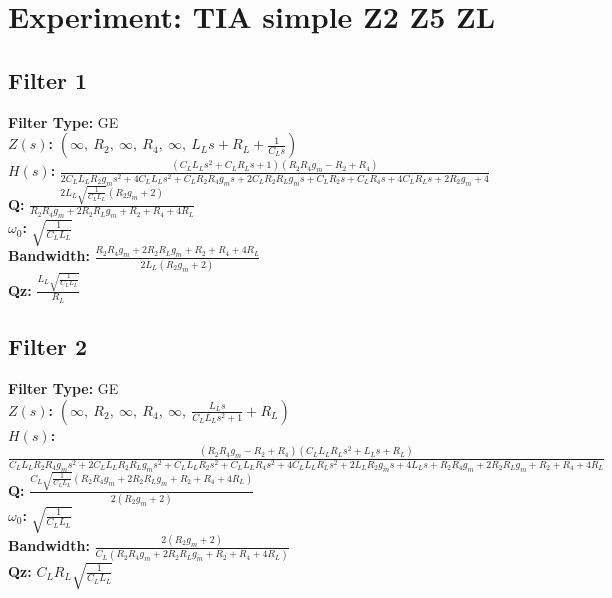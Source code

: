 \documentclass{article}
\begin{document}
        \section*{Experiment: TIA simple Z2 Z5 ZL}
\subsection*{Filter 1}
\textbf{Filter Type:} GE \\ 
\textbf{$Z(s)$:} $\left( \infty, \  R_{2}, \  \infty, \  R_{4}, \  \infty, \  L_{L} s + R_{L} + \frac{1}{C_{L} s}\right)$ \\ 
\textbf{$H(s)$:} $\frac{\left(C_{L} L_{L} s^{2} + C_{L} R_{L} s + 1\right) \left(R_{2} R_{4} g_{m} - R_{2} + R_{4}\right)}{2 C_{L} L_{L} R_{2} g_{m} s^{2} + 4 C_{L} L_{L} s^{2} + C_{L} R_{2} R_{4} g_{m} s + 2 C_{L} R_{2} R_{L} g_{m} s + C_{L} R_{2} s + C_{L} R_{4} s + 4 C_{L} R_{L} s + 2 R_{2} g_{m} + 4}$ \\ 
\textbf{Q:} $\frac{2 L_{L} \sqrt{\frac{1}{C_{L} L_{L}}} \left(R_{2} g_{m} + 2\right)}{R_{2} R_{4} g_{m} + 2 R_{2} R_{L} g_{m} + R_{2} + R_{4} + 4 R_{L}}$ \\ 
\textbf{$\omega_0$:} $\sqrt{\frac{1}{C_{L} L_{L}}}$ \\ 
\textbf{Bandwidth:} $\frac{R_{2} R_{4} g_{m} + 2 R_{2} R_{L} g_{m} + R_{2} + R_{4} + 4 R_{L}}{2 L_{L} \left(R_{2} g_{m} + 2\right)}$ \\ 
\textbf{Qz:} $\frac{L_{L} \sqrt{\frac{1}{C_{L} L_{L}}}}{R_{L}}$ \\ 
\subsection*{Filter 2}
\textbf{Filter Type:} GE \\ 
\textbf{$Z(s)$:} $\left( \infty, \  R_{2}, \  \infty, \  R_{4}, \  \infty, \  \frac{L_{L} s}{C_{L} L_{L} s^{2} + 1} + R_{L}\right)$ \\ 
\textbf{$H(s)$:} $\frac{\left(R_{2} R_{4} g_{m} - R_{2} + R_{4}\right) \left(C_{L} L_{L} R_{L} s^{2} + L_{L} s + R_{L}\right)}{C_{L} L_{L} R_{2} R_{4} g_{m} s^{2} + 2 C_{L} L_{L} R_{2} R_{L} g_{m} s^{2} + C_{L} L_{L} R_{2} s^{2} + C_{L} L_{L} R_{4} s^{2} + 4 C_{L} L_{L} R_{L} s^{2} + 2 L_{L} R_{2} g_{m} s + 4 L_{L} s + R_{2} R_{4} g_{m} + 2 R_{2} R_{L} g_{m} + R_{2} + R_{4} + 4 R_{L}}$ \\ 
\textbf{Q:} $\frac{C_{L} \sqrt{\frac{1}{C_{L} L_{L}}} \left(R_{2} R_{4} g_{m} + 2 R_{2} R_{L} g_{m} + R_{2} + R_{4} + 4 R_{L}\right)}{2 \left(R_{2} g_{m} + 2\right)}$ \\ 
\textbf{$\omega_0$:} $\sqrt{\frac{1}{C_{L} L_{L}}}$ \\ 
\textbf{Bandwidth:} $\frac{2 \left(R_{2} g_{m} + 2\right)}{C_{L} \left(R_{2} R_{4} g_{m} + 2 R_{2} R_{L} g_{m} + R_{2} + R_{4} + 4 R_{L}\right)}$ \\ 
\textbf{Qz:} $C_{L} R_{L} \sqrt{\frac{1}{C_{L} L_{L}}}$ \\ 
\end{document}
